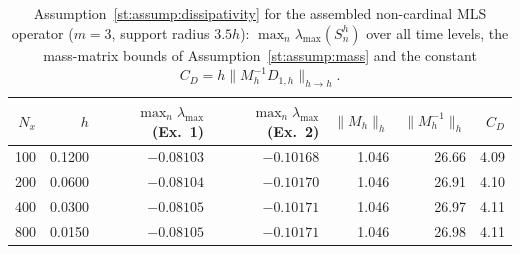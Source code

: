 \begin{table}[htbp]
\centering
\footnotesize
\caption{Assumption~\ref{st:assump:dissipativity} for the assembled non-cardinal MLS operator ($m=3$, support radius $3.5h$): $\max_n\lambda_{\max}(S_n^h)$ over all time levels, the mass-matrix bounds of Assumption~\ref{st:assump:mass} and the constant $C_D=h\|M_h^{-1}D_{1,h}\|_{h\to h}$.}
\label{tab:dissipativity}
\begin{tabular}{rrrrrrr}
\toprule
$N_x$ & $h$ & $\max_n\lambda_{\max}$ (Ex.~1) & $\max_n\lambda_{\max}$ (Ex.~2) & $\|M_h\|_h$ & $\|M_h^{-1}\|_h$ & $C_D$ \\
\midrule
100 & 0.1200 & $-0.08103$ & $-0.10168$ & 1.046 & 26.66 & 4.09 \\
200 & 0.0600 & $-0.08104$ & $-0.10170$ & 1.046 & 26.91 & 4.10 \\
400 & 0.0300 & $-0.08105$ & $-0.10171$ & 1.046 & 26.97 & 4.11 \\
800 & 0.0150 & $-0.08105$ & $-0.10171$ & 1.046 & 26.98 & 4.11 \\
\bottomrule
\end{tabular}
\end{table}
